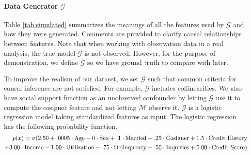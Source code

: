 \documentclass[11pt]{article}    %
\begin{document}
 \paragraph{Data Generator $\mathcal{G}$}
Table \ref{tab:simulated} summarizes the meanings of all the features used by $\mathcal{G}$ and how they were generated. Comments are provided to clarify causal relationships between features.  Note that when working with observation data in a real analysis, the true model $\mathcal{G}$ is not observed. However, for the purpose of demonstration, we define $\mathcal{G}$ so we have ground truth to compare with later. 
 
To improve the realism of our dataset, we set $\mathcal{G}$ such that common criteria for causal inference are not satisfied. For example, $\mathcal{G}$ includes collinearities. We also have social support function as an unobserved confounder by letting $\mathcal{G}$ use it to compute the cosigner feature and not letting $\mathcal{M}$ observe it.  $\mathcal{G}$ is a logistic regression model taking standardized features as input. The logistic regression has the following probability function,
\begin{equation}
\label{eqn:gt}
\small
\begin{split}
 p(x) = \sigma(2.50 +.0005\cdot\text{Age} -0\cdot\text{Sex} +.1 \cdot \text{Married} + .25\cdot \text{Cosigner} + 1.5 \cdot \text{Credit History} \\  + 3.00 \cdot \text{Income} - 1.00\cdot\text{Utilization} -.75 \cdot \text{Delinquency} - .50\cdot\text{Inquiries} + 5.00\cdot\text{Credit Score})
\end{split}
\end{equation}
\end{document}

